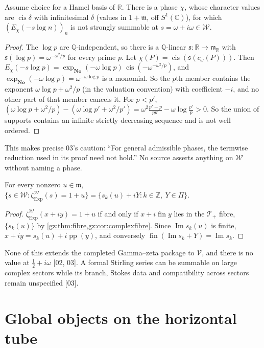 \documentclass[11pt,a4paper]{article}
\numberwithin{equation}{section}
\theoremstyle{definition}
\theoremstyle{remark}
\newcommand{\No}{\mathbf{No}}
\newcommand{\R}{\mathbb R}
\newcommand{\C}{\mathbb C}
\newcommand{\Q}{\mathbb Q}
\newcommand{\Z}{\mathbb Z}
\newcommand{\mm}{\mathfrak m}
\renewcommand{\Im}{\operatorname{Im}}
\newcommand{\pp}{\operatorname{pp}}
\newcommand{\fin}{\operatorname{fin}}
\newcommand{\cis}{\operatorname{cis}}
\newcommand{\Exp}{\operatorname{Exp}}
\newcommand{\Tp}{\mathcal T_{+}}
\newcommand{\Wing}{\mathcal W}
\newcommand{\Vs}{\mathcal V}
\newcommand{\src}[1]{\textup{[#1]}}
\newcommand{\merge}{\textup{[merge]}}
\begin{document}
\begin{proposition}[Wing sums can fail \merge]\label{gz:prop:wingfail}
Assume choice for a Hamel basis of $\R$. There is a phase $\chi$, whose
character values are $\cis\delta$ with infinitesimal $\delta$ (values in
$1+\mm$, off $S^1(\C)$), for which $(E_\chi(-s\log n))_n$ is not
strongly summable at $s=\omega+i\omega\in\Wing$.
\end{proposition}
\begin{proof}
The $\log p$ are $\Q$-independent, so there is a $\Q$-linear
$\mathfrak s:\R\to\mm_\R$ with $\mathfrak s(\log p)=\omega^{-\omega^2/p}$ for every
prime $p$. Let $\chi(P)=\cis(\mathfrak s(c_\omega(P)))$. Then
$E_\chi(-s\log p)=\exp_{\No}(-\omega\log p)\,\cis(-\omega^{-\omega^2/p})$, and
$\exp_{\No}(-\omega\log p)=\omega^{-\omega\log p}$ is a monomial. So the $p$th
member contains the exponent $\omega\log p+\omega^2/p$ (in the valuation
convention) with coefficient $-i$, and no other part of that member cancels
it. For $p<p'$,
$(\omega\log p+\omega^2/p)-(\omega\log p'+\omega^2/p')=\omega^2\frac{p'-p}{pp'}-\omega\log\frac{p'}p>0$.
So the union of supports contains an infinite strictly decreasing sequence
and is not well ordered.
\end{proof}
This makes precise 03's caution: ``For general admissible phases, the
termwise reduction used in its proof need not hold.'' No source asserts anything on $\Wing$
without naming a phase.

\begin{corollary}[Wing fibres \merge; from \src{01, 03}]\label{gz:cor:wingfibre}
For every nonzero $u\in\mm$,
$\{s\in\Wing:\zeta^\Wing_{\Exp}(s)=1+u\}=\{s_k(u)+iY:k\in\Z,\ Y\in\Pi\}$.
\end{corollary}
\begin{proof}
$\zeta^\Wing_{\Exp}(x+iy)=1+u$ if and only if $x+i\fin y$ lies in the $\Tp$
fibre, $\{s_k(u)\}$ by \cref{gz:thm:fibre,gz:cor:complexfibre}. Since
$\Im s_k(u)$ is finite, $x+iy=s_k(u)+i\pp(y)$, and conversely
$\fin(\Im s_k+Y)=\Im s_k$.
\end{proof}
None of this extends the completed Gamma--zeta package to $\Vs$, and there is
no value at $\tfrac12+i\omega$ \src{02, 03}. A formal Stirling series can be
summable on large complex sectors while its branch, Stokes data and
compatibility across sectors remain unspecified \src{03}.

\part{Global objects on the horizontal tube}\label{gz:part:tube}
\end{document}
